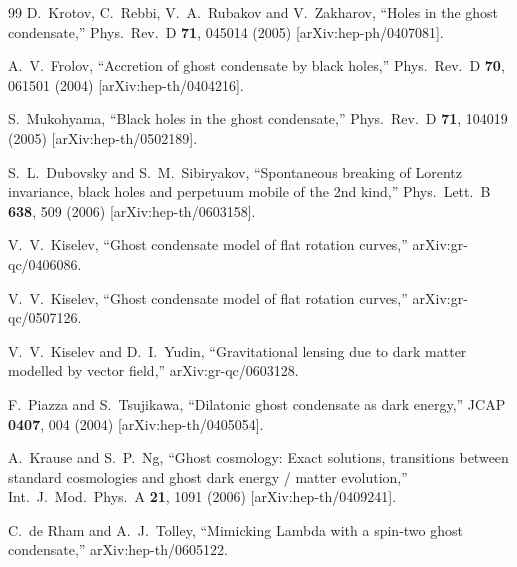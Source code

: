 \begin{thebibliography}{99}
  D.~Krotov, C.~Rebbi, V.~A.~Rubakov and V.~Zakharov,
  ``Holes in the ghost condensate,''
  Phys.\ Rev.\ D {\bf 71}, 045014 (2005)
  [arXiv:hep-ph/0407081].

  A.~V.~Frolov,
  ``Accretion of ghost condensate by black holes,''
  Phys.\ Rev.\ D {\bf 70}, 061501 (2004)
  [arXiv:hep-th/0404216].

  S.~Mukohyama,
  ``Black holes in the ghost condensate,''
  Phys.\ Rev.\ D {\bf 71}, 104019 (2005)
  [arXiv:hep-th/0502189].

  S.~L.~Dubovsky and S.~M.~Sibiryakov,
  ``Spontaneous breaking of Lorentz invariance, black holes and perpetuum
  mobile of the 2nd kind,''
  Phys.\ Lett.\ B {\bf 638}, 509 (2006)
  [arXiv:hep-th/0603158].

  V.~V.~Kiselev,
  ``Ghost condensate model of flat rotation curves,''
  arXiv:gr-qc/0406086.

  V.~V.~Kiselev,
  ``Ghost condensate model of flat rotation curves,''
  arXiv:gr-qc/0507126.

  V.~V.~Kiselev and D.~I.~Yudin,
  ``Gravitational lensing due to dark matter modelled by vector field,''
  arXiv:gr-qc/0603128.

  F.~Piazza and S.~Tsujikawa,
  ``Dilatonic ghost condensate as dark energy,''
  JCAP {\bf 0407}, 004 (2004)
  [arXiv:hep-th/0405054].

  A.~Krause and S.~P.~Ng,
  ``Ghost cosmology: Exact solutions, transitions between standard  cosmologies
  and ghost dark energy / matter evolution,''
  Int.\ J.\ Mod.\ Phys.\ A {\bf 21}, 1091 (2006)
  [arXiv:hep-th/0409241].

  C.~de Rham and A.~J.~Tolley,
  ``Mimicking Lambda with a spin-two ghost condensate,''
  arXiv:hep-th/0605122.


\end{thebibliography}
